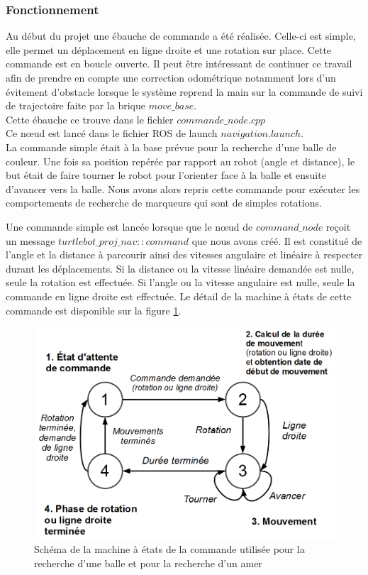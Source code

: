 \documentclass[10pt,a4paper]{article}
\begin{document}
\subsubsection{Fonctionnement}

Au début du projet une ébauche de commande a été réalisée. Celle-ci est simple, elle permet un déplacement en ligne droite et une rotation sur place. Cette commande est en boucle ouverte. Il peut \^etre intéressant de continuer ce travail afin de prendre en compte une correction odométrique notamment lors d'un évitement d'obstacle lorsque le système reprend la main sur la commande de suivi de trajectoire faite par la brique $move\_base$.\\
Cette ébauche ce trouve dans le fichier $commande\_node.cpp$ \\
Ce nœud est lancé dans le fichier ROS de launch $navigation.launch$.\\

La commande simple était à la base prévue pour la recherche d'une balle de couleur. Une fois sa position repérée par rapport au robot (angle et distance), le but était de faire tourner le robot pour l'orienter face à la balle et ensuite d'avancer vers la balle. Nous avons alors repris cette commande pour exécuter les comportements de recherche de marqueurs qui sont de simples rotations. 

Une commande simple est lancée lorsque que le nœud de $command\_node$ reçoit un message $turtlebot\_proj\_nav::command$ que nous avons créé. Il est constitué de l'angle et la distance à parcourir ainsi des vitesses angulaire et linéaire à respecter durant les déplacements. Si la distance ou la vitesse linéaire demandée est nulle, seule la rotation est effectuée. Si l'angle ou la vitesse angulaire est nulle, seule la commande en ligne droite est effectuée. Le détail de la machine à états de cette commande est disponible sur la figure \ref{commande_MEF}.

\begin{figure}[!h]
\centering\includegraphics[scale=0.4]{figures/commande_MEF.png}
\caption{Schéma de la machine à états de la commande utilisée pour la recherche d'une balle et pour la recherche d'un amer}
\label{commande_MEF}
\end{figure}
\end{document}
